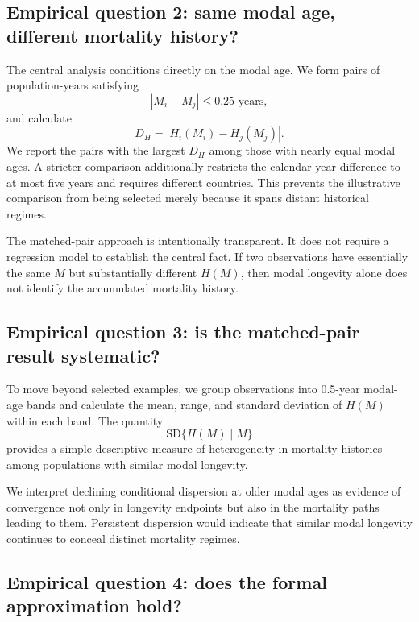 \documentclass[doublespace]{interact}
\begin{document}
\subsection{Empirical question 2: same modal age, different mortality history?}

The central analysis conditions directly on the modal age. We form pairs of population-years satisfying
\begin{equation}
|M_i-M_j|\leq0.25 \text{ years},
\end{equation}
and calculate
\begin{equation}
D_H=|H_i(M_i)-H_j(M_j)|.
\end{equation}
We report the pairs with the largest $D_H$ among those with nearly equal modal ages. A stricter comparison additionally restricts the calendar-year difference to at most five years and requires different countries. This prevents the illustrative comparison from being selected merely because it spans distant historical regimes.

The matched-pair approach is intentionally transparent. It does not require a regression model to establish the central fact. If two observations have essentially the same $M$ but substantially different $H(M)$, then modal longevity alone does not identify the accumulated mortality history.

\subsection{Empirical question 3: is the matched-pair result systematic?}

To move beyond selected examples, we group observations into 0.5-year modal-age bands and calculate the mean, range, and standard deviation of $H(M)$ within each band. The quantity
\begin{equation}
\mathrm{SD}\{H(M)\mid M\}
\end{equation}
provides a simple descriptive measure of heterogeneity in mortality histories among populations with similar modal longevity.

We interpret declining conditional dispersion at older modal ages as evidence of convergence not only in longevity endpoints but also in the mortality paths leading to them. Persistent dispersion would indicate that similar modal longevity continues to conceal distinct mortality regimes.

\subsection{Empirical question 4: does the formal approximation hold?}
\end{document}
